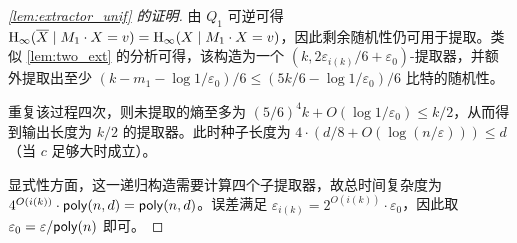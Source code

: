 \begin{proof}[\cref{lem:extractor_unif} 的证明]
    由 $Q_1$ 可逆可得 $\mathrm{H}_\infty(\overline{X} \mid M_1 \cdot X = v) = \mathrm{H}_\infty(X \mid M_1 \cdot X = v)$，因此剩余随机性仍可用于提取。类似 \cref{lem:two_ext} 的分析可得，该构造为一个 $(k, 2 \varepsilon_{i(k)}/6 + \varepsilon_0)$-提取器，并额外提取出至少 $(k - m_1 - \log 1 / \varepsilon_0)/6 \le (5k/6 - \log 1 / \varepsilon_0)/6$ 比特的随机性。

    重复该过程四次，则未提取的熵至多为 $(5/6)^4 k + O(\log 1 / \varepsilon_0) \le k/2$，从而得到输出长度为 $k/2$ 的提取器。此时种子长度为 $4 \cdot (d/8 + O(\log(n/\varepsilon))) \le d$（当 $c$ 足够大时成立）。

    显式性方面，这一递归构造需要计算四个子提取器，故总时间复杂度为 $4^{O(i(k))} \cdot \mathsf{poly}(n,d) = \mathsf{poly}(n,d)$。误差满足 $\varepsilon_{i(k)} = 2^{O(i(k))} \cdot \varepsilon_0$，因此取 $\varepsilon_0 = \varepsilon / \mathsf{poly}(n)$ 即可。
\end{proof}